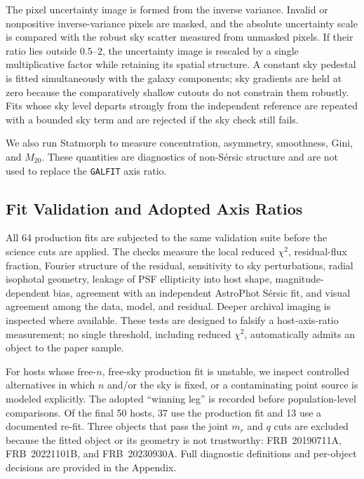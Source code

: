 \documentclass[10pt,twocolumn]{article}
\begin{document}
The pixel uncertainty image is formed from the inverse variance.  Invalid or
nonpositive inverse-variance pixels are masked, and the absolute uncertainty
scale is compared with the robust sky scatter measured from unmasked pixels.
If their ratio lies outside $0.5$--$2$, the uncertainty image is rescaled by a
single multiplicative factor while retaining its spatial structure.  A
constant sky pedestal is fitted simultaneously with the galaxy components;
sky gradients are held at zero because the comparatively shallow cutouts do
not constrain them robustly.  Fits whose sky level departs strongly from the
independent reference are repeated with a bounded sky term and are rejected
if the sky check still fails.

We also run Statmorph \citep{2019MNRAS.483.4140R} to measure concentration,
asymmetry, smoothness, Gini, and $M_{20}$.  These quantities are diagnostics
of non-S\'ersic structure and are not used to replace the \texttt{GALFIT}
axis ratio.

\subsection{Fit Validation and Adopted Axis Ratios}
\label{subsec:validation}

All 64 production fits are subjected to the same validation suite before the
science cuts are applied.  The checks measure the local reduced
$\chi^2$, residual-flux fraction, Fourier structure of the residual,
sensitivity to sky perturbations, radial isophotal geometry, leakage of PSF
ellipticity into host shape, magnitude-dependent bias, agreement with an
independent AstroPhot S\'ersic fit, and visual agreement among the data,
model, and residual.  Deeper archival imaging is inspected where available.
These tests are designed to falsify a host-axis-ratio measurement; no single
threshold, including reduced $\chi^2$, automatically admits an object to the
paper sample.

For hosts whose free-$n$, free-sky production fit is unstable, we inspect
controlled alternatives in which $n$ and/or the sky is fixed, or a contaminating
point source is modeled explicitly.  The adopted ``winning leg'' is recorded
before population-level comparisons.  Of the final 50 hosts, 37 use the
production fit and 13 use a documented re-fit.  Three objects that pass the
joint $m_r$ and $q$ cuts are excluded because the fitted object or its geometry
is not trustworthy: FRB~20190711A, FRB~20221101B, and FRB~20230930A.
Full diagnostic definitions and per-object decisions are provided in the
Appendix.
\end{document}
